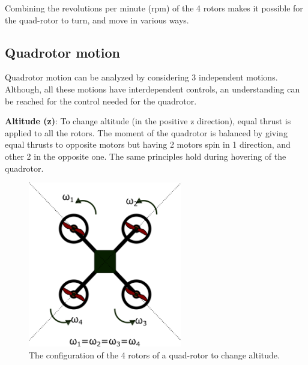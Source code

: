 \documentclass[hidelinks,BTech]{iitmdiss}
\begin{document}
Combining the revolutions per minute (rpm) of the 4 rotors makes it possible for the quad-rotor to turn, and move in various ways.


\subsection{Quadrotor motion}
Quadrotor motion can be analyzed by considering 3 independent motions. Although, all these motions have interdependent controls, an understanding can be reached for the control needed for the quadrotor.

{\bf Altitude (z)}: To change altitude (in the positive z direction), equal thrust is applied to all the rotors. The moment of the quadrotor is balanced by giving equal thrusts to opposite motors but having 2 motors spin in 1 direction, and other 2 in the opposite one. The same principles hold during hovering of the quadrotor.
\begin{figure}[H]
  \centering
    \includegraphics[width=0.6\textwidth]{Quadrotor_altitude.png}
    \caption{The configuration of the 4 rotors of a quad-rotor to change altitude.}
\end{figure}
\end{document}
